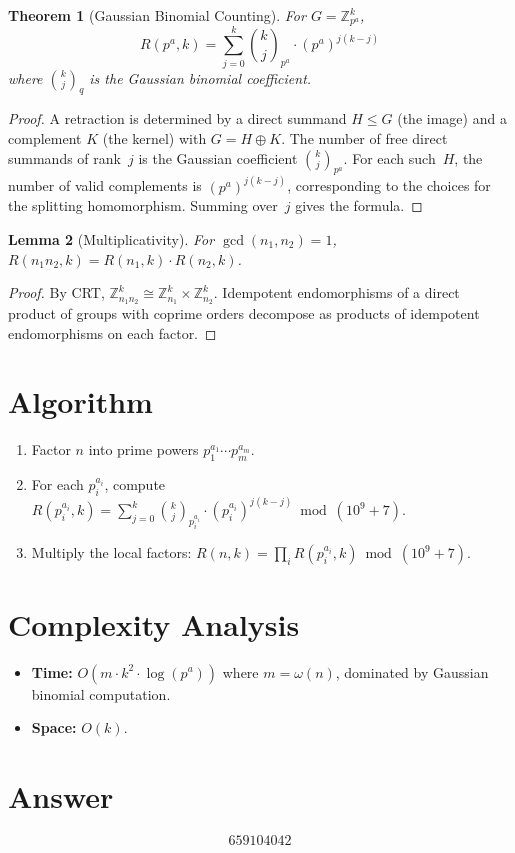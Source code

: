 \documentclass[12pt]{article}
\newtheorem{theorem}{Theorem}
\newtheorem{lemma}[theorem]{Lemma}
\begin{document}
\begin{theorem}[Gaussian Binomial Counting]
For $G = \mathbb{Z}_{p^a}^k$,
\[
R(p^a, k) = \sum_{j=0}^{k} \binom{k}{j}_{p^a} \cdot (p^a)^{j(k-j)}
\]
where $\binom{k}{j}_q$ is the Gaussian binomial coefficient.
\end{theorem}

\begin{proof}
A retraction is determined by a direct summand $H \leq G$ (the image) and a complement $K$ (the kernel) with $G = H \oplus K$. The number of free direct summands of rank~$j$ is the Gaussian coefficient $\binom{k}{j}_{p^a}$. For each such~$H$, the number of valid complements is $(p^a)^{j(k-j)}$, corresponding to the choices for the splitting homomorphism. Summing over~$j$ gives the formula.
\end{proof}

\begin{lemma}[Multiplicativity]
For $\gcd(n_1, n_2) = 1$, $R(n_1 n_2, k) = R(n_1, k) \cdot R(n_2, k)$.
\end{lemma}

\begin{proof}
By CRT, $\mathbb{Z}_{n_1 n_2}^k \cong \mathbb{Z}_{n_1}^k \times \mathbb{Z}_{n_2}^k$. Idempotent endomorphisms of a direct product of groups with coprime orders decompose as products of idempotent endomorphisms on each factor.
\end{proof}

\section{Algorithm}

\begin{enumerate}
\item Factor $n$ into prime powers $p_1^{a_1} \cdots p_m^{a_m}$.
\item For each $p_i^{a_i}$, compute $R(p_i^{a_i}, k) = \sum_{j=0}^{k} \binom{k}{j}_{p_i^{a_i}} \cdot (p_i^{a_i})^{j(k-j)} \bmod (10^9+7)$.
\item Multiply the local factors: $R(n, k) = \prod_i R(p_i^{a_i}, k) \bmod (10^9+7)$.
\end{enumerate}

\section{Complexity Analysis}

\begin{itemize}
\item \textbf{Time:} $O(m \cdot k^2 \cdot \log(p^a))$ where $m = \omega(n)$, dominated by Gaussian binomial computation.
\item \textbf{Space:} $O(k)$.
\end{itemize}

\section{Answer}

\[
\boxed{659104042}
\]
\end{document}
